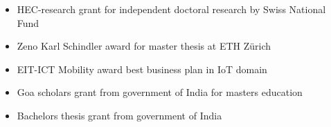 \vspace{-0.1cm}
\begin{itemize}[leftmargin=*]
	\item HEC-research grant for independent doctoral research by Swiss National Fund
	\vspace{-0.2cm}
	\item Zeno Karl Schindler award for master thesis at ETH Zürich
	\vspace{-0.2cm}
	\item EIT-ICT Mobility award best business plan in IoT domain
	\vspace{-0.2cm}
	\item Goa scholars grant from government of India for masters education
	\vspace{-0.2cm}
	\item Bachelors thesis grant from government of India
\end{itemize}